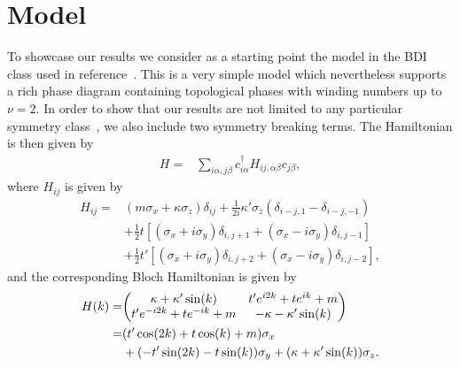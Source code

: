\documentclass[twocolumn,amsmath,longbibliography,amssymb,superscriptaddress]{revtex4-1}
\begin{document}
\section{Model}
To showcase our results we consider as a starting point the model in the BDI class used in reference~\cite{Song2014}. 
This is a very simple model which nevertheless supports a rich phase diagram containing topological phases with winding numbers up to $\nu =2$. 
In order to show that our results are not limited to any particular symmetry class~\cite{ryu2010topological}, we also include two symmetry breaking terms. 
The Hamiltonian is then given by
\begin{align}
H =& \sum_{i\alpha,j\beta} c_{i\alpha}^\dagger H_{ij,\alpha \beta} c_{j\beta},
\end{align}
where $H_{ij} $ is given by 
\begin{align}
H_{ij} =& (m \sigma_x + \kappa \sigma_z)\delta_{ij}  + \frac{1}{2i}\kappa'\sigma_z (\delta_{i-j,1}-\delta_{i-j,-1})\nonumber\\
&+ \frac{1}{2} t \left[(\sigma_x + i \sigma_y)\delta_{i,j+1} + (\sigma_x - i \sigma_y) \delta_{i,j-1} \right] \nonumber\\
&+  \frac{1}{2} t' \left[(\sigma_x + i \sigma_y)\delta_{i,j+2} + (\sigma_x - i \sigma_y) \delta_{i,j-2} \right],
\label{bdi_model}
\end{align}
and the corresponding Bloch Hamiltonian is given by
\begin{align}
H(k)=&\mqty( \kappa + \kappa' \sin(k) & t' e^{i2k} + t e^{ik}+m \nonumber\\t' e^{-i2k} + t e^{-ik}+m & -\kappa-\kappa' \sin(k)  )\nonumber \\
=& (t' \cos(2k)+t\cos(k)+m)\sigma_x \\
&+ (-t' \sin(2k)-t\sin(k))\sigma_y + (\kappa+\kappa'\sin(k)) \sigma_z.\nonumber
\end{align}
\end{document}

